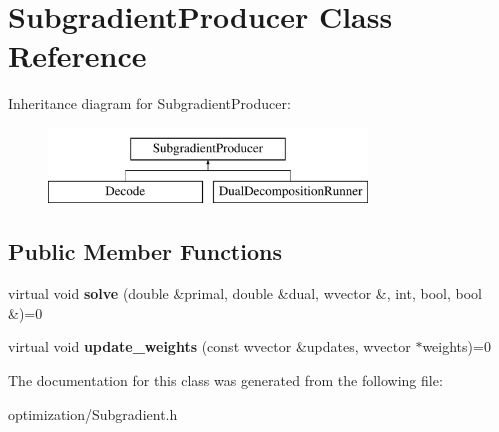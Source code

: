 \hypertarget{class_subgradient_producer}{
\section{SubgradientProducer Class Reference}
\label{class_subgradient_producer}
}
Inheritance diagram for SubgradientProducer:\begin{figure}[H]
\begin{center}
\leavevmode
\includegraphics[height=2cm]{class_subgradient_producer}
\end{center}
\end{figure}
\subsection*{Public Member Functions}
\begin{DoxyCompactItemize}
\item 
\hypertarget{class_subgradient_producer_acea0e6ef35f9f3fd2f14872740471628}{
virtual void {\bfseries solve} (double \&primal, double \&dual, wvector \&, int, bool, bool \&)=0}
\label{class_subgradient_producer_acea0e6ef35f9f3fd2f14872740471628}

\item 
\hypertarget{class_subgradient_producer_a5b471526b337913722f56221b2461d89}{
virtual void {\bfseries update\_\-weights} (const wvector \&updates, wvector $\ast$weights)=0}
\label{class_subgradient_producer_a5b471526b337913722f56221b2461d89}

\end{DoxyCompactItemize}


The documentation for this class was generated from the following file:\begin{DoxyCompactItemize}
\item 
optimization/Subgradient.h\end{DoxyCompactItemize}
